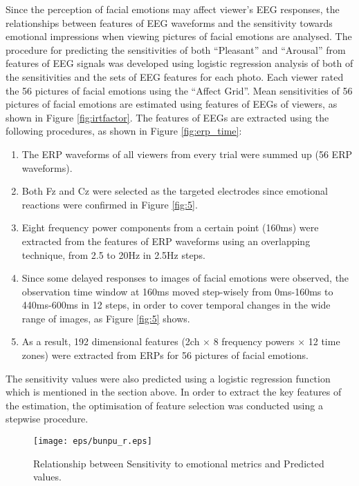 \documentclass[fonts]{icst}
\begin{document}
Since the perception of facial emotions may affect viewer's EEG
responses, the relationships between features of EEG waveforms and
the sensitivity towards emotional impressions when viewing 
pictures of facial emotions are analysed. 
The procedure for predicting the sensitivities of both ``Pleasant'' and
``Arousal'' from features of EEG signals was developed using logistic
regression analysis of both of the sensitivities and the sets of EEG
features for each photo. 
Each viewer rated the 56 pictures of facial emotions using the ``Affect Grid''. 
Mean sensitivities of 56 pictures of facial emotions are estimated using
features of EEGs of viewers, as shown in Figure \ref{fig:irtfactor}. 
The features of EEGs are extracted using the following procedures, as
shown in Figure \ref{fig:erp_time}:
\begin{enumerate}
\item The ERP waveforms of all viewers from every trial were summed up
      (56 ERP waveforms). 
\item Both Fz and Cz were selected as the targeted electrodes since
      emotional reactions were confirmed in Figure \ref{fig:5}.
\item Eight frequency power components from a certain point (160ms) were
      extracted from the features of ERP waveforms using an overlapping
      technique,  from 2.5 to 20Hz in 2.5Hz steps.
\item Since some delayed responses to images of facial emotions were
      observed, the observation time window at 160ms moved step-wisely
      from 0ms-160ms to 440ms-600ms in 12 steps, in order to cover
      temporal changes in the wide range of images, as Figure
      \ref{fig:5} shows.   
\item As a result, 192 dimensional features (2ch $\times$ 8 frequency
      powers $\times$ 12 time zones) were extracted from ERPs for 56
      pictures of facial emotions.
\end{enumerate}

The sensitivity values were also predicted using a logistic regression 
function which is mentioned in the section above. 
In order to extract the key features of the estimation, the optimisation
of feature selection was conducted using a stepwise procedure. 

\begin{figure}[tb]
   \begin{center}
    \texttt{[image: eps/bunpu\_r.eps]}
   \end{center}
  \caption{Relationship between Sensitivity to emotional metrics and
 Predicted values.}
  \label{fig:bunpu}
\end{figure}
\end{document}

